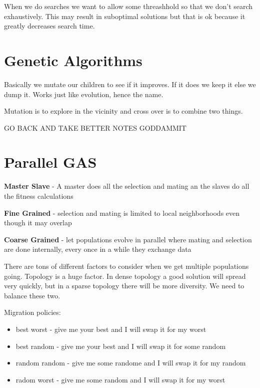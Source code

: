 \documentclass[12pt]{article}
\begin{document}
When we do searches we want to allow some threashhold so that we don't search exhaustively. This may result in suboptimal solutions but that is ok because it greatly decreases search time. 

\section{Genetic Algorithms} %
  \label{sec:genetic_algorithms}
  Basically we mutate our children to see if it improves. If it does we keep it else we dump it. Works just like evolution, hence the name.


  Mutation is to explore in the vicinity and cross over is to combine two things.



GO BACK AND TAKE BETTER NOTES GODDAMMIT






\section{Parallel GAS} %
\label{sec:parallel_gas}
\textbf{Master Slave} - A master does all the selection and mating an the slaves do all the fitness calculations

\textbf{Fine Grained} - selection and mating is limited to local neighborhoods even though it may overlap

\textbf{Coarse Grained} - let populations evolve in parallel where mating and selection are done internally, every once in a while they exchange data

There are tons of different factors to consider when we get multiple populations going. Topology is a huge factor. In dense topology a good solution will spread very quickly, but in a sparse topology there will be more diversity. We need to balance these two.

Migration policies:
\begin{itemize}
  \item best worst - give me your best and I will swap it for my worst
  \item best random - give me your best and I will swap it for some random
  \item random random - give me some randome and I will swap it for my random
  \item radom worst - give me some random and I will swap it for my worst
\end{itemize}
\end{document}
